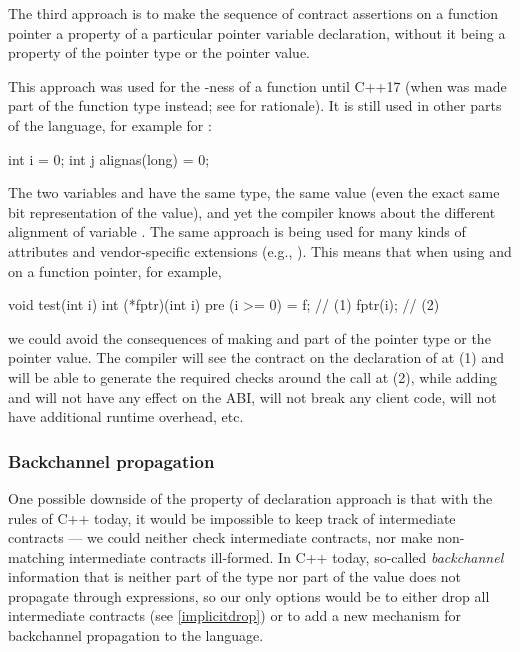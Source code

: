 The third approach is to make the sequence of contract assertions on a function pointer a property of a particular pointer variable declaration, without it being a property of the pointer type or the pointer value.

This approach was used for the -ness of a function until C++17 (when  was made part of the function type instead; see \cite{P0012R1} for rationale). It is still used in other parts of the language, for example for :
\begin{codeblock}
int i = 0;
int j alignas(long) = 0;
\end{codeblock}
The two variables  and  have the same type, the same value (even the exact same bit representation of the value), and yet the compiler knows about the different alignment of variable . The same approach is being used for many kinds of attributes and vendor-specific extensions (e.g., ). This means that when using   and  on a function pointer, for example,
\begin{codeblock}
void test(int i) {
  int (*fptr)(int i) pre (i >= 0) = f;  // (1)
  fptr(i);  // (2)
}
\end{codeblock}
we could avoid the consequences of making   and  part of the pointer type or the pointer value. The compiler will see the contract on the declaration of  at (1) and will be able to generate the required checks around the call at (2), while adding  and  will not have any effect on the ABI, will not break any client code, will not have additional runtime overhead, etc.

\subsubsection{Backchannel propagation}

One possible downside of the property of declaration approach is that with the rules of C++ today, it would be impossible to keep track of intermediate contracts --- we could neither check intermediate contracts, nor make non-matching intermediate contracts ill-formed. In C++ today, so-called \emph{backchannel} information that is neither part of the type nor part of the value does not propagate through expressions, so our only options would be to either drop all intermediate contracts (see \ref{implicitdrop}) or to add a new mechanism for backchannel propagation to the language.

